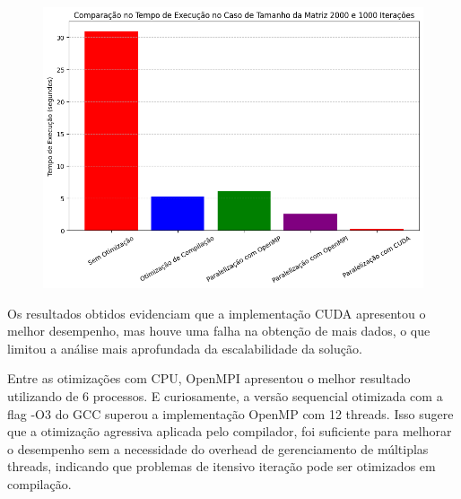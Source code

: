 \begin{figure}[H]
    \centering
    \includegraphics[width=1\linewidth]{../assets/Final.png}
\end{figure}

Os resultados obtidos evidenciam que a implementação CUDA apresentou o melhor desempenho, mas houve uma falha na obtenção de mais dados, o que limitou a análise mais aprofundada da escalabilidade da solução.

Entre as otimizações com CPU, OpenMPI apresentou o melhor resultado utilizando de 6 processos. E curiosamente, a versão sequencial otimizada com a flag -O3 do GCC superou a implementação OpenMP com 12 threads. Isso sugere que a otimização agressiva aplicada pelo compilador, foi suficiente para melhorar o desempenho sem a necessidade do overhead de gerenciamento de múltiplas threads, indicando que problemas de itensivo iteração pode ser otimizados em compilação.
